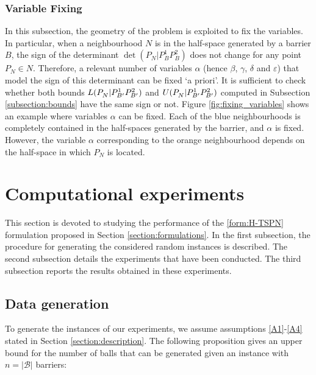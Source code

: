 \documentclass[a4paper,  review, authoryear, 1p.]{elsarticle}
\newcommand{\determinant}[3]{\det({#1|#2#3})}
\begin{document}
	\subsubsection{Variable Fixing}
	In this subsection, the geometry of the problem is exploited to fix the variables. In particular, when a neighbourhood $N$ is in the half-space generated by a barrier $B$, the sign of the determinant $\determinant{P_N}{P_B^1}{P_B^2}$ does not change for any point $P_N\in N$. Therefore, a relevant number of variables $\alpha$ (hence $\beta$, $\gamma$, $\delta$ and $\varepsilon$) that model the sign of this determinant can be fixed `a priori'. It is sufficient to check whether both bounds $L(P_N^{}|P_{B'}^1P_{B'}^2)$ and $U(P_N^{}|P_{B'}^1P_{B'}^2)$ computed in Subsection \ref{subsection:bounds} have the same sign or not. Figure \ref{fig:fixing_variables} shows an example where variables $\alpha$ can be fixed. Each of the blue neighbourhoods is completely contained in the half-spaces generated by the barrier, and $\alpha$ is fixed. However, the variable $\alpha$ corresponding to the orange neighbourhood depends on the half-space in which $P_N$ is located.
	
	
	
	\section{Computational experiments}\label{section:experiments}
	This section is devoted to studying the performance of the \eqref{form:H-TSPN} formulation proposed in Section \ref{section:formulations}. In the first subsection, the procedure for generating the considered random instances is described. The second subsection details the experiments that have been conducted. The third subsection reports the results obtained in these experiments.
	
	\subsection{Data generation}
	
	To generate the instances of our experiments, we assume  assumptions \ref{A1}-\ref{A4} stated in Section \ref{section:description}. The following proposition gives an upper bound for the number of balls that can be generated given an instance with $n=|\mathcal B|$ barriers:
	
\end{document}
